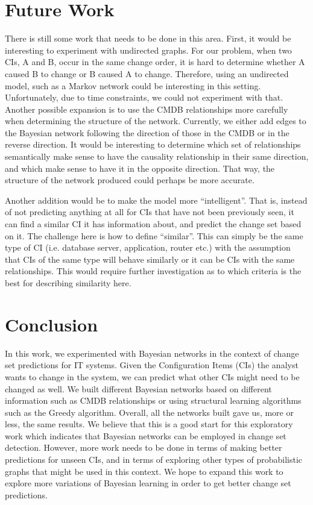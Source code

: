 \documentclass[10pt,twocolumn,letterpaper]{article}
\begin{document}
\section{Future Work}
\label{sec:future}

There is still some work that needs to be done in this area. First, it would be interesting to experiment with undirected graphs. For our problem, when two CIs,
A and B, occur in the same change order, it is hard to determine whether A caused B to change or B caused A to change. Therefore, using an undirected model,
such as a Markov network could be interesting in this setting. Unfortunately, due to time constraints, we could not experiment with that. Another possible
expansion is to use the CMDB relationships more carefully when determining the structure of the network. Currently, we either add edges to the Bayesian network
following the direction of those in the CMDB or in the reverse direction. It would be interesting to determine which set of relationships semantically make
sense to have the causality relationship in their same direction, and which make sense to have it in the opposite direction. That way, the structure of the
network produced could perhaps be more accurate.

Another addition would be to make the model more ``intelligent''. That is, instead of not predicting anything at all for CIs that have not been previously
seen, it can find a similar CI it has information about, and predict the change set based on it. The challenge here is how to define ``similar''. This can
simply be the same type of CI (i.e. database server, application, router etc.) with the assumption that CIs of the same type will behave similarly or it can be
CIs with the same relationships. This would require further investigation as to which criteria is the best for describing similarity here.

\section{Conclusion}
\label{sec:concl}

In this work, we experimented with Bayesian networks in the context of change set predictions for IT systems. Given the Configuration Items (CIs) the analyst
wants to change in the system, we can predict what other CIs might need to be changed as well. We built different Bayesian networks based on different
information such as CMDB relationships or using structural learning algorithms such as the Greedy algorithm. Overall, all the networks built gave us, more or
less, the same results. We believe that this is a good start for this exploratory work which indicates that Bayesian networks can be employed in change set
detection. However, more work needs to be done in terms of making better predictions for unseen CIs, and in terms of exploring other types of probabilistic
graphs that might be used in this context. We hope to expand this work to explore more variations of Bayesian learning in order to get better change set
predictions.




\end{document}
